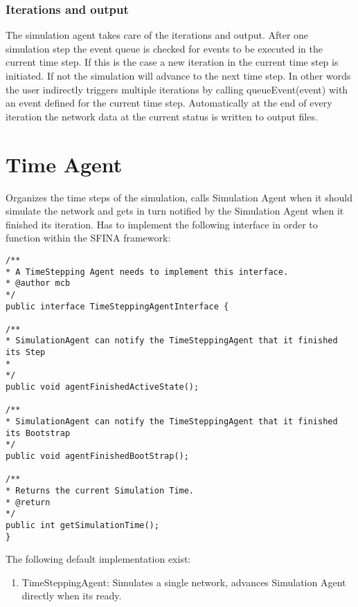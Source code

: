 \documentclass[11pt,fleqn]{book} %
\newcommand{\mainagent}{simulation agent}
\newcommand{\MainAgent}{Simulation Agent }
\newcommand{\TimeAgent}{Time Agent }
\begin{document}
\subsubsection{Iterations and output}
The \mainagent{} takes care of the iterations and output. After one simulation step the event queue is checked for events to be executed in the current time step. If this is the case a new iteration in the current time step is initiated. If not the simulation will advance to the next time step. In other words the user indirectly triggers multiple iterations by calling queueEvent(event) with an event defined for the current time step. Automatically at the end of every iteration the network data at the current status is written to output files.

\section{\TimeAgent}\index{Agent!\TimeAgent}\label{sec:time_agent}
Organizes the time steps of the simulation, calls \MainAgent when it should simulate the network and gets in turn notified by the \MainAgent when it finished its iteration. 
Has to implement the following interface in order to function within the SFINA framework:

\begin{lstlisting}[frame=single] 
/**
* A TimeStepping Agent needs to implement this interface.
* @author mcb
*/
public interface TimeSteppingAgentInterface {

/**
* SimulationAgent can notify the TimeSteppingAgent that it finished its Step
* 
*/
public void agentFinishedActiveState();

/**
* SimulationAgent can notify the TimeSteppingAgent that it finished its Bootstrap
*/
public void agentFinishedBootStrap();

/**
* Returns the current Simulation Time.
* @return 
*/
public int getSimulationTime(); 
}
\end{lstlisting}


The following default implementation exist:
	\begin{enumerate}
		\item TimeSteppingAgent: Simulates a single network, advances \MainAgent directly when its ready.
	\end{enumerate}
\end{document}
